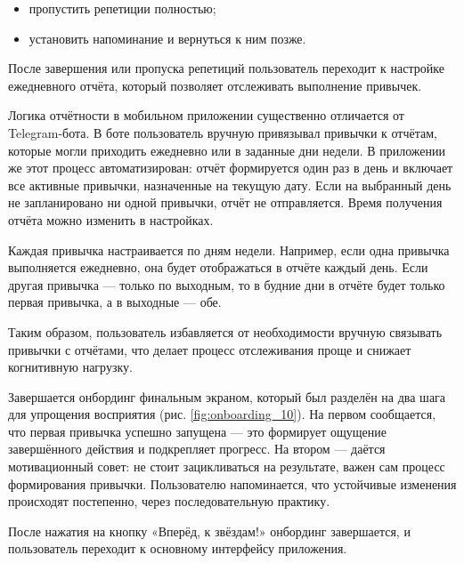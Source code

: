 \documentclass[pdflatex,sn-mathphys-num]{sn-jnl}%
\theoremstyle{thmstyleone}%
\theoremstyle{thmstyletwo}%
\theoremstyle{thmstylethree}%
\begin{document}
\begin{itemize}
\item пропустить репетиции полностью;
\item установить напоминание и вернуться к ним позже.
\end{itemize}

После завершения или пропуска репетиций пользователь переходит к настройке ежедневного отчёта, который позволяет отслеживать выполнение привычек.

Логика отчётности в мобильном приложении существенно отличается от Telegram-бота. В боте пользователь вручную привязывал привычки к отчётам, которые могли приходить ежедневно или в заданные дни недели. В приложении же этот процесс автоматизирован: отчёт формируется один раз в день и включает все активные привычки, назначенные на текущую дату. Если на выбранный день не запланировано ни одной привычки, отчёт не отправляется. Время получения отчёта можно изменить в настройках.

Каждая привычка настраивается по дням недели. Например, если одна привычка выполняется ежедневно, она будет отображаться в отчёте каждый день. Если другая привычка — только по выходным, то в будние дни в отчёте будет только первая привычка, а в выходные — обе.

Таким образом, пользователь избавляется от необходимости вручную связывать привычки с отчётами, что делает процесс отслеживания проще и снижает когнитивную нагрузку.

Завершается онбординг финальным экраном, который был разделён на два шага для упрощения восприятия (рис. \ref{fig:onboarding_10}). На первом сообщается, что первая привычка успешно запущена — это формирует ощущение завершённого действия и подкрепляет прогресс. На втором — даётся мотивационный совет: не стоит зацикливаться на результате, важен сам процесс формирования привычки. Пользователю напоминается, что устойчивые изменения происходят постепенно, через последовательную практику.

После нажатия на кнопку «Вперёд, к звёздам!» онбординг завершается, и пользователь переходит к основному интерфейсу приложения.
\end{document}
